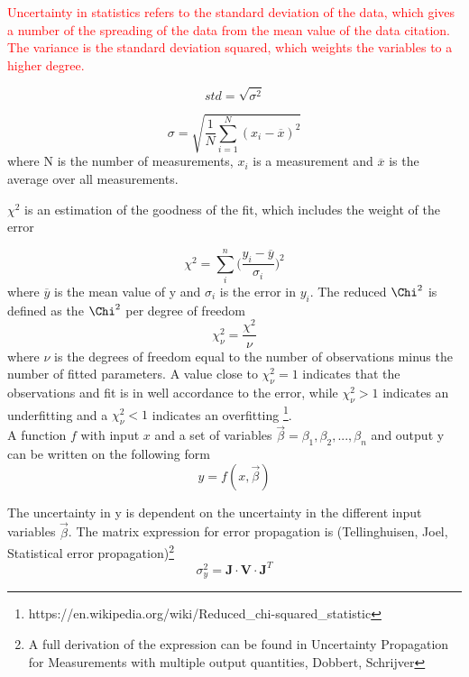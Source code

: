 \documentclass[a4paper,11pt,twoside]{book}
\begin{document}
\noindent \textcolor{red}{Uncertainty in statistics refers to the standard deviation of the data, which gives a number of the spreading of the data from the mean value of the data \textcolor{red}{citation}. The variance is the standard deviation squared, which weights the variables to a higher degree. }

\begin{equation}
    std = \sqrt{\sigma^2}
\end{equation}

\begin{equation} \label{eq:standard_dev}
    \sigma = \sqrt{\frac{1}{N}\sum_{i=1}^N (x_i - \overline{x})^2}
\end{equation}
\noindent
where N is the number of measurements, $x_i$ is a measurement and $\overline{x}$ is the average over all measurements. 

$\chi^2$ is an estimation of the goodness of the fit, which includes the weight of the error

\begin{equation}
    \chi^2 = \sum_i^n \Big( \frac{y_i - \overline{y}}{\sigma_i} \Big)^2
\end{equation}
where $\overline{y}$ is the mean value of y and $\sigma_i$ is the error in $y_i$. The reduced $\Chi^2$ is defined as the $\Chi^2$ per degree of freedom 
\begin{equation} \label{eq:chisq_DOF}
    \chi^2_\nu = \frac{\chi^2}{\nu}
\end{equation}
where $\nu$ is the degrees of freedom equal to the number of observations minus the number of fitted parameters. A value close to $\chi^2_\nu=1$ indicates that the observations and fit is in well accordance to the error, while $\chi^2_\nu>1$ indicates an underfitting and a $\chi^2_\nu<1$ indicates an overfitting \footnote{https://en.wikipedia.org/wiki/Reduced_chi-squared_statistic}. \\

\noindent 
A function $f$ with input $x$ and a set of variables $\vec{\beta}= \beta_1, \beta_2, ..., \beta_n$ and output y can be written on the following form
\begin{equation}
    y = f(x, \vec{\beta})
\end{equation}

\noindent The uncertainty in y is dependent on the uncertainty in the different input variables $ \vec{\beta}$. The matrix expression for error propagation is (Tellinghuisen, Joel, Statistical error propagation)\footnote{A full derivation of the expression can be found in Uncertainty Propagation for Measurements with multiple output quantities, Dobbert, Schrijver}
\begin{equation} \label{eq:variance_full}
    \sigma^2_y = \mathbf{J}\cdot \mathbf{V}\cdot \mathbf{J}^T 
\end{equation} 
\end{document}
